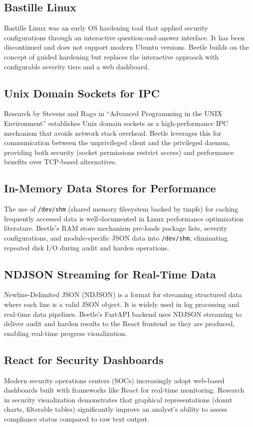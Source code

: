 \subsection{Bastille Linux}
Bastille Linux was an early OS hardening tool that applied security configurations through an interactive question-and-answer interface. It has been discontinued and does not support modern Ubuntu versions. Beetle builds on the concept of guided hardening but replaces the interactive approach with configurable severity tiers and a web dashboard.

\subsection{Unix Domain Sockets for IPC}
Research by Stevens and Rago in ``Advanced Programming in the UNIX Environment'' establishes Unix domain sockets as a high-performance IPC mechanism that avoids network stack overhead. Beetle leverages this for communication between the unprivileged client and the privileged daemon, providing both security (socket permissions restrict access) and performance benefits over TCP-based alternatives.

\subsection{In-Memory Data Stores for Performance}
The use of \texttt{/dev/shm} (shared memory filesystem backed by tmpfs) for caching frequently accessed data is well-documented in Linux performance optimization literature. Beetle's RAM store mechanism pre-loads package lists, severity configurations, and module-specific JSON data into \texttt{/dev/shm}, eliminating repeated disk I/O during audit and harden operations.

\subsection{NDJSON Streaming for Real-Time Data}
Newline-Delimited JSON (NDJSON) is a format for streaming structured data where each line is a valid JSON object. It is widely used in log processing and real-time data pipelines. Beetle's FastAPI backend uses NDJSON streaming to deliver audit and harden results to the React frontend as they are produced, enabling real-time progress visualization.

\subsection{React for Security Dashboards}
Modern security operations centers (SOCs) increasingly adopt web-based dashboards built with frameworks like React for real-time monitoring. Research in security visualization demonstrates that graphical representations (donut charts, filterable tables) significantly improve an analyst's ability to assess compliance status compared to raw text output.

